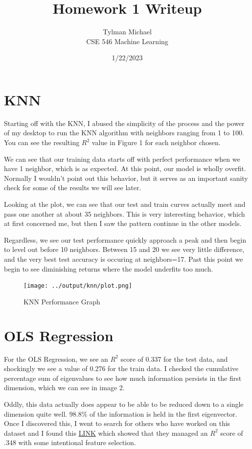 \documentclass[12pt]{article}
\title{Homework 1 Writeup}
\author{Tylman Michael\\CSE 546 Machine Learning}
\date{1/22/2023}
\begin{document}
\maketitle{}
\section{KNN}

Starting off with the KNN, I abused the simplicity of the process and the power of my desktop to run the KNN algorithm
with neighbors ranging from 1 to 100. You can see the resulting $R^2$ value in Figure 1 for each neighbor chosen.

We can see that our training data starts off with perfect performance when we have 1 neighbor, which is as expected.
At this point, our model is wholly overfit. 
Normally I wouldn't point out this behavior, but it serves as an important sanity check for some of the results we 
will see later. 

Looking at the plot, we can see that our test and train curves actually meet and pass one another at about 35 neighbors.
This is very interesting behavior, which at first concerned me, but then I saw the pattern continue in the other models.

Regardless, we see our test performance quickly approach a peak and then begin to level out before 10 neighbors. 
Between 15 and 20 we see very little difference, and the very best test accuracy is occuring at neighbors=17. Past this 
point we begin to see diminishing returns where the model underfits too much. 
\begin{figure}
    \texttt{[image: ../output/knn/plot.png]}
    \caption{KNN Performance Graph}
    \label{image1}
\end{figure}

\section{OLS Regression}
For the OLS Regression, we see an $R^2$ score of 0.337 for the test data, and shockingly we see a value of 0.276 for the 
train data. I checked the cumulative percentage sum of eigenvalues to see how much information persists in the first 
dimension, which we can see in image 2.

Oddly, this data actually does appear to be able to be reduced down to a single dimension quite well. 98.8\% of the information
is held in the first eigenvector. Once I discovered this, I went to search for others who have worked on this dataset and I found
this \href{https://towardsdatascience.com/red-wine-quality-prediction-using-regression-modeling-and-machine-learning-7a3e2c3e1f46}{LINK}
which showed that they managed an $R^2$ score of .348 with some intentional feature selection.
\end{document}
